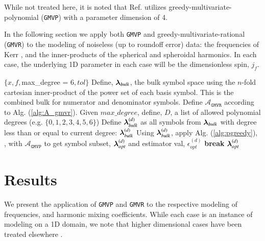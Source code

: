 \documentclass[twocolumn,aps,prd,floatfix,preprintnumbers,a4paper,nofootinbib,
superscriptaddress,10pt]{revtex4-1}
\def\jf{j_f}
\def\gmvp#1{greedy-multivariate-polynomial#1
  (\texttt{GMVP}#1)\gdef\gmvp{\texttt{GMVP}}}
\def\gmvr#1{greedy-multivariate-rational#1
  (\texttt{GMVR}#1)\gdef\gmvr{\texttt{GMVR}}}
\begin{document}
%
\par While not treated here, it is noted that Ref. \cite{London:2018gaq} utilizes \gmvp{} with a parameter dimension of 4.
%
\par In the following section we apply both \gmvp{} and \gmvr{} to the modeling of noiseless (up to roundoff error) data: the \qnm{} frequencies of Kerr , and the inner-products of the spherical and spheroidal harmonics.
%
In each case, the underlying 1D parameter in each case will be the dimensionless \bh{} spin, $\jf{}$.
%
\hspace{1cm}
{\scriptsize
\begin{algorithm}[H]
  \caption{\gmvr{}, a degree tempered stepwise algorithm for multivariate rational modeling of scalar data.}
  \label{alg:gmvr}
  \begin{algorithmic}[1]
     $ \{ x, f, $max\_degree = 6$, tol \}$
    \vskip 10pt
    \State Define, ${\bm{\lambda}}_{bulk}$, the bulk symbol space using the $n$-fold cartesian inner-product of the power set of each basis symbol. This is the combined bulk for numerator and denominator symbols.
    \State Define $\mathcal{A}_{\gmvr{}}$ according to Alg. (\ref{alg:A_gmvr}).
    \State Given $max\_degree$, define, ${ D}$, a list of allowed polynomial degrees (e.g. $\{0,1,2,3,4,5,6\}$)
      \State Define ${\bm{\lambda}}_{bulk}^{(d)}$ as all symbols from ${\bm{\lambda}}_{bulk}$ with degree less than or equal to current degree: ${\bm{\lambda}}^{(d)}_{bulk}$
      \State Using ${\bm{\lambda}}_{bulk}^{(d)}$, apply Alg. (\ref{alg:pgreedy}), \pgreedy{}, with $\mathcal{A}_{\gmvp{}}$ to get symbol subset, ${\bm{\lambda}}^{(d)}_{opt}$ and estimator val, $\epsilon^{(d)}_{opt}$
        \State \textbf{break}
      \EndIf
    \EndFor
    \vskip 10pt
     ${\bm{\lambda}}^{(d)}_{opt}$
  \end{algorithmic}
\end{algorithm}
}
%
%
\section{Results}
\label{results}
%
\par We present the application of \gmvp{} and \gmvr{} to the respective modeling of \qnm{} frequencies, and harmonic mixing coefficients.
%
While each case is an instance of modeling on a 1D domain, we note that higher dimensional cases have been treated elsewhere \cite{London:2018gaq}.
%
\end{document}
